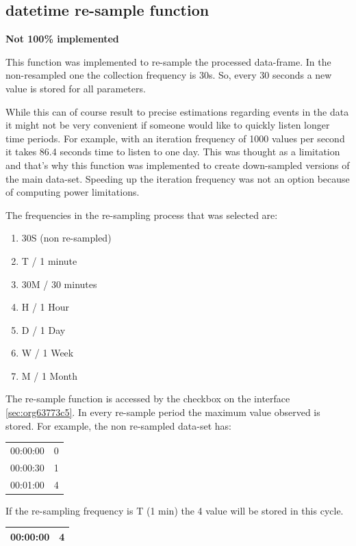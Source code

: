 \documentclass[11pt]{article}
\begin{document}
\subsection{datetime re-sample function}
\label{sec:orgc402696}
\textbf{Not 100\% implemented}

This function was implemented to re-sample the processed data-frame.  In the non-resampled one the collection frequency is 30s. So, every 30 seconds a new value is stored for all parameters.

While this can of course result to precise estimations regarding events in the data it might not be very convenient if someone would like to quickly listen longer time periods.  For example, with an iteration frequency of 1000 values per second it takes 86.4 seconds time to listen to one day.  This was thought as a limitation and that's why this function was implemented to create down-sampled versions of the main data-set.  Speeding up the iteration frequency was not an option because of computing power limitations.

The frequencies in the re-sampling process that was selected are:
\begin{enumerate}
\item 30S (non re-sampled)
\item T / 1 minute
\item 30M / 30 minutes
\item H / 1 Hour
\item D / 1 Day
\item W / 1 Week
\item M / 1 Month
\end{enumerate}

The re-sample function is accessed by the checkbox on the interface \ref{sec:org63773c5}.  In every re-sample period the maximum value observed is stored.  For example, the non re-sampled data-set has:

\begin{center}
\begin{tabular}{rr}
\hline
00:00:00 & 0\\
00:00:30 & 1\\
00:01:00 & 4\\
\hline
\end{tabular}
\end{center}

If the re-sampling frequency is T (1 min) the 4 value will be stored in this cycle.

\begin{center}
\begin{tabular}{rr}
\hline
00:00:00 & 4\\
\hline
\end{tabular}
\end{center}
\end{document}
